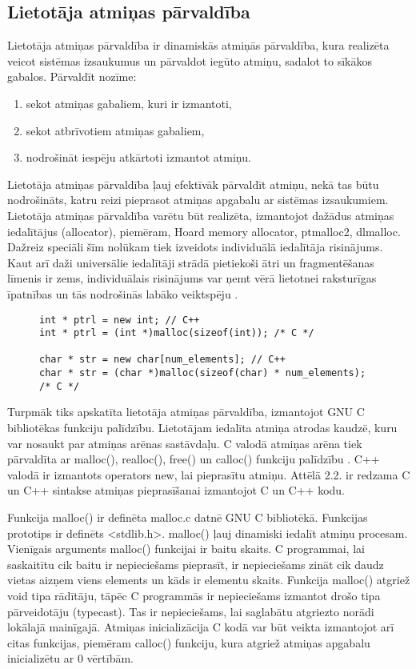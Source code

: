  
 
 
\subsection{Lietotāja atmiņas pārvaldība}
Lietotāja atmiņas pārvaldība ir dinamiskās atmiņās pārvaldība, kura realizēta veicot sistēmas izsaukumus un pārvaldot iegūto atmiņu, sadalot to sīkākos gabalos.
Pārvaldīt nozīme: 
\begin{enumerate}
\item sekot atmiņas gabaliem, kuri ir izmantoti,
\item sekot atbrīvotiem atmiņas gabaliem,
\item nodrošināt iespēju atkārtoti izmantot atmiņu.
\end{enumerate}

Lietotāja atmiņas pārvaldība ļauj efektīvāk pārvaldīt atmiņu, nekā tas būtu nodrošināts, katru reizi pieprasot atmiņas apgabalu ar sistēmas izsaukumiem.
Lietotāja atmiņas pārvaldība varētu būt realizēta, izmantojot dažādus atmiņas iedalītājus (allocator), piemēram, Hoard memory allocator, ptmalloc2, dlmalloc.
Dažreiz speciāli šīm nolūkam tiek izveidots individuālā iedalītāja risinājums. 
Kaut arī daži universālie iedalītāji strādā pietiekoši ātri un fragmentēšanas līmenis ir zems, individuālais risinājums var ņemt vērā lietotnei raksturīgas īpatnības un tās nodrošinās labāko veiktspēju \cite{EDBG}.
\begin{figure}[h]
\begin{lstlisting}
int * ptrl = new int; // C++
int * ptrl = (int *)malloc(sizeof(int)); /* C */

char * str = new char[num_elements]; // C++
char * str = (char *)malloc(sizeof(char) * num_elements); /* C */
\end{lstlisting}
\caption{\textbf{\fontsize{11}{12}\selectfont {Dinamiskās atmiņas iedalīšana C un C++}}}
\end{figure}

Turpmāk tiks apskatīta lietotāja atmiņas pārvaldība, izmantojot GNU C bibliotēkas funkciju palīdzību.
Lietotājam iedalīta atmiņa atrodas kaudzē, kuru var nosaukt par atmiņas arēnas sastāvdaļu. 
C valodā atmiņas arēna tiek pārvaldīta ar malloc(), realloc(), free() un calloc() funkciju palīdzību \cite {atparv}.
C++ valodā ir izmantots operators new, lai pieprasītu atmiņu. 
Attēlā 2.2. ir redzama C un C++ sintakse atmiņas pieprasīšanai izmantojot C un C++ kodu.


Funkcija malloc() ir definēta malloc.c datnē GNU C bibliotēkā. 
Funkcijas prototips ir definēts <stdlib.h>.
malloc() ļauj dinamiski iedalīt atmiņu procesam.
Vienīgais arguments malloc() funkcijai ir baitu skaits.
C programmai, lai saskaitītu cik baitu ir nepieciešams pieprasīt, ir nepieciešams zināt cik daudz vietas aizņem viens elements un kāds ir elementu skaits.
Funkcija malloc() atgriež void tipa rādītāju, tāpēc C programmās ir nepieciešams izmantot drošo tipa pārveidotāju (typecast). 
Tas ir nepieciešams, lai saglabātu atgriezto norādi lokālajā mainīgajā. Atmiņas inicializācija C kodā
var būt veikta izmantojot arī citas funkcijas, piemēram calloc() funkciju, kura atgriež atmiņas apgabalu inicializētu ar 0 vērtībām.




